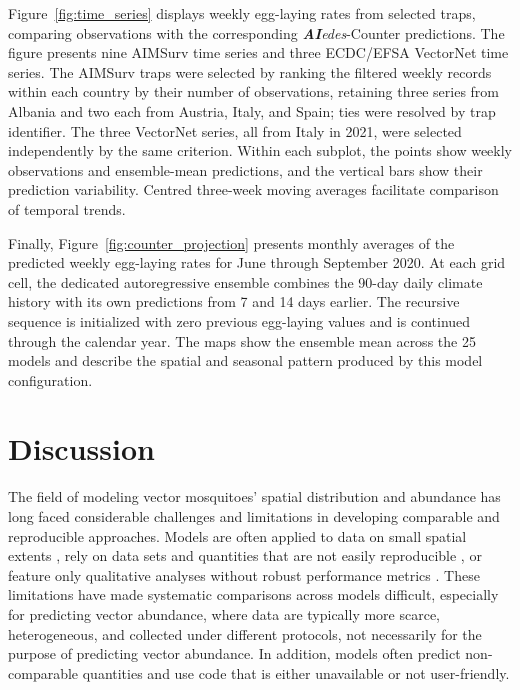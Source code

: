 \documentclass[preprint,12pt]{elsarticle}
\begin{document}
Figure~\ref{fig:time_series} displays weekly egg-laying rates from selected traps, comparing observations with the corresponding \textit{\textbf{AI}edes}-Counter predictions. The figure presents nine AIMSurv time series and three ECDC/EFSA VectorNet time series. The AIMSurv traps were selected by ranking the filtered weekly records within each country by their number of observations, retaining three series from Albania and two each from Austria, Italy, and Spain; ties were resolved by trap identifier. The three VectorNet series, all from Italy in 2021, were selected independently by the same criterion. Within each subplot, the points show weekly observations and ensemble-mean predictions, and the vertical bars show their prediction variability. Centred three-week moving averages facilitate comparison of temporal trends.


Finally, Figure~\ref{fig:counter_projection} presents monthly averages of the predicted weekly egg-laying rates for June through September 2020. At each grid cell, the dedicated autoregressive ensemble combines the 90-day daily climate history with its own predictions from 7 and 14 days earlier. The recursive sequence is initialized with zero previous egg-laying values and is continued through the calendar year. The maps show the ensemble mean across the 25 models and describe the spatial and seasonal pattern produced by this model configuration.\\




\section{Discussion}

The field of modeling vector mosquitoes' spatial distribution and abundance has long faced considerable challenges and limitations in developing comparable and reproducible approaches. Models are often applied to data on small spatial extents \cite{guzzetta2016, Kioutsioukis2019, angelou2021, dare2022, dare2025, kinney2024rapid}, rely on data sets and quantities that are not easily reproducible \cite{li2019}, or feature only qualitative analyses without robust performance metrics \cite{davis2024, zardini2024}. These limitations have made systematic comparisons across models difficult, especially for predicting vector abundance, where data are typically more scarce, heterogeneous, and collected under different protocols, not necessarily for the purpose of predicting vector abundance. In addition, models often predict non-comparable quantities and use code that is either unavailable or not user-friendly.
\end{document}
